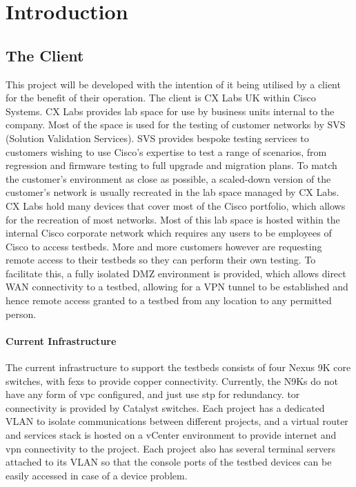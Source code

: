 \chapter{Introduction}
\label{chap:intro}

\section{The Client}
\label{intro:client}
This project will be developed with the intention of it
being utilised by a client for the benefit of their operation. The client is
CX Labs UK within Cisco Systems. CX Labs provides lab space for
use by business
units internal to the company. Most of the space is used for
the testing of
customer networks by SVS (Solution Validation Services). SVS
provides bespoke
testing services to customers wishing to use Cisco’s expertise
to test a range
of scenarios, from regression and firmware testing to full
upgrade and
migration plans.\newline
To match the customer's environment as close as
possible, a scaled-down
version of the customer's network is usually recreated
in the lab space managed
by CX Labs. CX Labs hold many devices that cover most
of the Cisco portfolio,
which allows for the recreation of most networks. Most
of this lab space is
hosted within the internal Cisco corporate network which
requires any users to
be employees of Cisco to access testbeds. More and more
customers
however are requesting remote access to their testbeds so they can
perform their own testing. To facilitate this, a
fully isolated DMZ environment
is provided, which allows direct WAN
connectivity to a testbed, allowing for a
VPN tunnel to be established and
hence remote access granted to a testbed from
any location to any permitted
person.

\subsubsection{Current Infrastructure}
The current infrastructure to support the testbeds consists of four Nexus 9K
core switches, with \gls{fex}s to provide copper connectivity. Currently, the
N9Ks do not have any form of \gls{vpc} configured, and just use \gls{stp} for
redundancy. \gls{tor} connectivity is provided by Catalyst switches. Each
project has a dedicated VLAN to isolate communications between different
projects, and a virtual router and services stack is hosted on a vCenter
environment to provide internet and \gls{vpn} connectivity to the project. Each
project also has several terminal servers attached to its VLAN so that the
console ports of the testbed devices can be easily accessed in case of a device
problem.

